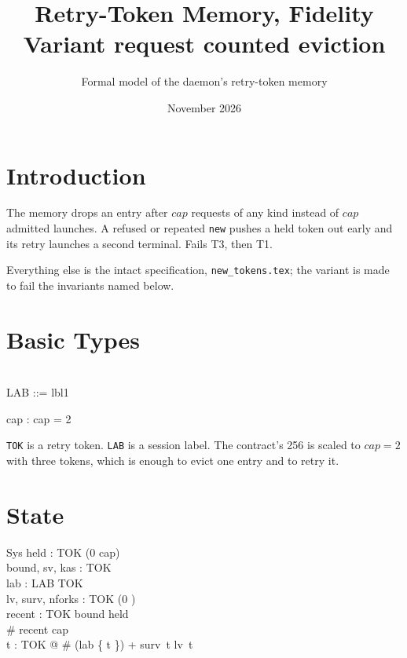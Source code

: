 \documentclass[a4paper,10pt,fleqn]{article}
\begin{document}
\title{Retry-Token Memory, Fidelity Variant request counted eviction}
\author{Formal model of the daemon's retry-token memory}
\date{November 2026}
\maketitle

\section{Introduction}

The memory drops an entry after $cap$ requests of any kind instead of $cap$ admitted launches. A refused or repeated \texttt{new} pushes a held token out early and its retry launches a second terminal. Fails T3, then T1.

Everything else is the intact specification, \texttt{new\_tokens.tex}; the variant is made to fail the invariants named below.

\section{Basic Types}

\begin{zed}
  [TOK] \\
  LAB ::= lbl1
\end{zed}

\begin{axdef}
  cap : \nat
\where
  cap = 2
\end{axdef}

\texttt{TOK} is a retry token.  \texttt{LAB} is a session label.  The
contract's 256 is scaled to $cap = 2$ with three tokens, which is enough to
evict one entry and to retry it.

\section{State}

\begin{schema}{Sys}
  held : TOK \pfun (0 \upto cap) \\
  bound, sv, kas : \power TOK \\
  lab : LAB \pfun TOK \\
  lv, surv, nforks : TOK \fun (0 ) \\
  recent : \seq TOK
\where
  bound \subseteq \dom held \\
  \# recent \leq cap \\
  \forall t : TOK @ \# (lab \rres \{ t \}) + surv~t \leq lv~t
\end{schema}
\end{document}
